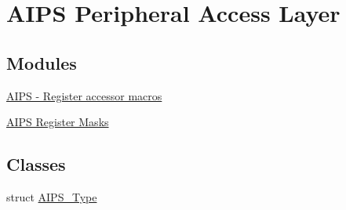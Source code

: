 \hypertarget{group__AIPS__Peripheral__Access__Layer}{}\section{A\+I\+PS Peripheral Access Layer}
\label{group__AIPS__Peripheral__Access__Layer}
\subsection*{Modules}
\begin{DoxyCompactItemize}
\item 
\hyperlink{group__AIPS__Register__Accessor__Macros}{A\+I\+P\+S -\/ Register accessor macros}
\item 
\hyperlink{group__AIPS__Register__Masks}{A\+I\+P\+S Register Masks}
\end{DoxyCompactItemize}
\subsection*{Classes}
\begin{DoxyCompactItemize}
\item 
struct \hyperlink{structAIPS__Type}{A\+I\+P\+S\+\_\+\+Type}
\end{DoxyCompactItemize}

